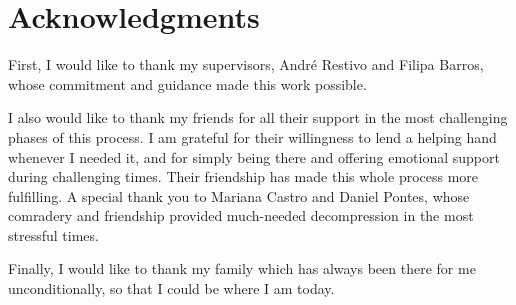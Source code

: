 \chapter*{Acknowledgments}
First, I would like to thank my supervisors, André Restivo and Filipa Barros, whose commitment and guidance made this work possible. 

I also would like to thank my friends for all their support in the most challenging phases of this process. I am grateful for their willingness to lend a helping hand whenever I needed it, and for simply being there and offering emotional support during challenging times. Their friendship has made this whole process more fulfilling. A special thank you to Mariana Castro and Daniel Pontes, whose comradery and friendship provided much-needed decompression in the most stressful times.

Finally, I would like to thank my family which has always been there for me unconditionally, so that I could be where I am today.
\vspace{10mm}
